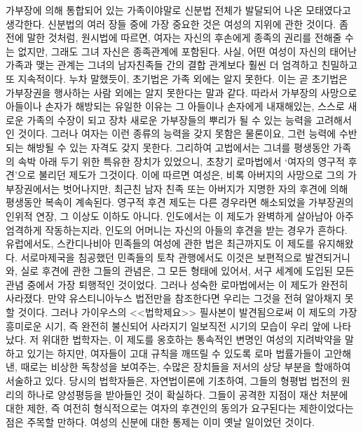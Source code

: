 가부장에 의해 통합되어 있는 가족이야말로
신분법 전체가 발달되어 나온 모태였다고 생각한다.
신분법의 여러 장들 중에
가장 중요한 것은 여성의 지위에 관한 것이다.
좀 전에 말한 것처럼,
원시법에 따르면,
여자는 자신의 후손에게 종족의 권리를 전해줄 수는 없지만,
그래도 그녀 자신은 종족관계에 포함된다.
사실, 어떤 여성이 자신의 태어난 가족과 맺는 관계는
그녀의 남자친족들 간의 결합 관계보다
훨씬 더 엄격하고 친밀하고 또 지속적이다.
누차 말했듯이,
초기법은 가족 외에는 알지 못한다.
이는 곧 초기법은 가부장권을 행사하는 사람 외에는 알지 못한다는 말과 같다.
따라서 가부장의 사망으로 아들이나 손자가 해방되는 유일한 이유는
그 아들이나 손자에게 내재해있는,
스스로 새로운 가족의 수장이 되고
장차 새로운 가부장들의 뿌리가 될 수 있는
능력을 고려해서인 것이다.
그러나 여자는 이런 종류의 능력을 갖지 못함은 물론이요,
그런 능력에 수반되는 해방될 수 있는 자격도 갖지 못한다.
그리하여 고법에서는
그녀를 평생동안 가족의 속박 아래 두기 위한 특유한 장치가 있었으니,
초창기 로마법에서
`여자의 영구적 후견'으로 불리던 제도가 그것이다.
이에 따르면 여성은,
비록 아버지의 사망으로 그의 가부장권에서는 벗어나지만,
최근친 남자 친족 또는 아버지가 지명한 자의 후견에 의해
평생동안
복속이
계속된다.
영구적 후견 제도는
다른 경우라면 해소되었을
가부장권의 인위적 연장, 그 이상도 이하도 아니다.
인도에서는 이 제도가 완벽하게 살아남아
아주 엄격하게 작동하는지라, 인도의 어머니는
자신의 아들의 후견을 받는 경우가 흔하다.
유럽에서도,
스칸디나비아 민족들의
여성에 관한
법은 최근까지도 이 제도를 유지해왔다.
서로마제국을 침공했던 민족들의 토착 관행에서도 이것은 보편적으로
발견되거니와, 실로 후견에 관한 그들의 관념은, 그 모든 형태에 있어서,
서구 세계에 도입된 모든 관념 중에서 가장 퇴행적인 것이었다.
그러나 성숙한 로마법에서는 이 제도가 완전히 사라졌다.
만약 유스티니아누스 법전만을 참조한다면
우리는 그것을 전혀 알아채지 못할 것이다.
그러나 가이우스의 <<법학제요>> 필사본이 발견됨으로써
이 제도의 가장 흥미로운 시기,
즉 완전히 불신되어 사라지기 일보직전 시기의
모습이 우리 앞에 나타났다.
저 위대한 법학자는,
이 제도를 옹호하는 통속적인 변명인
여성의 지려박약을 말하고 있기는 하지만,
여자들이
고대 규칙을 깨뜨릴 수 있도록
로마 법률가들이 고안해낸, 때로는 비상한 독창성을 보여주는,
수많은 장치들을
저서의 상당 부분을 할애하여
서술하고 있다.
당시의 법학자들은,
자연법이론에 기초하여,
그들의 형평법 법전의 원리의 하나로
양성평등을
받아들인 것이 확실하다.
그들이 공격한 지점이 재산 처분에 대한 제한,
즉 여전히 형식적으로는 여자의 후견인의 동의가 요구된다는
제한이었다는 점은 주목할 만하다.
여성의 신분에 대한 통제는 이미 옛날 일이었던 것이다.

